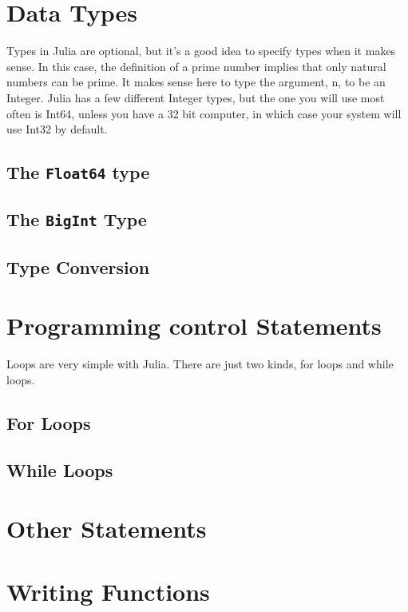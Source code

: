 \section{Data Types}
Types in Julia are optional, but it's a good idea to specify types when it makes sense. In this case, the definition of a prime number implies that only natural numbers can be prime. It makes sense here to type the argument, n, to be an Integer. Julia has a few different Integer types, but the one you will use most often is Int64, unless you have a 32 bit computer, 
in which case your system will use Int32 by default.
\subsection{The \texttt{Float64} type }
\subsection{The \texttt{BigInt} Type}

\subsection{Type Conversion}
\newpage
\section{Programming control Statements}
Loops are very simple with Julia. There are just two kinds, for loops and while loops.
\subsection{For Loops}

\subsection{While Loops}

\section{Other Statements}


\newpage
\section{Writing Functions}
